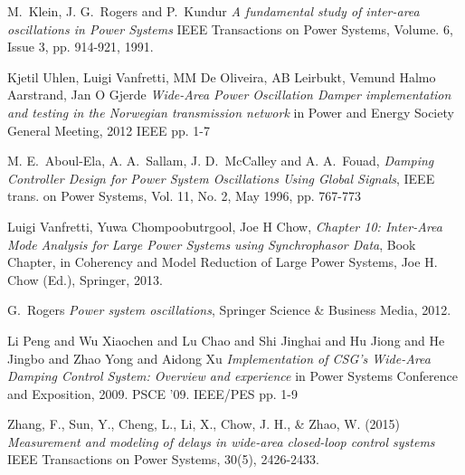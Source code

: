 \documentclass[journal]{IEEEtran}
\begin{document}
%
%
%
\begin{thebibliography}{1}

M.~Klein, J. G.~Rogers and P.~Kundur \emph{A fundamental study of inter-area oscillations in Power Systems}  IEEE Transactions on Power Systems, Volume. 6, Issue 3, pp. 914-921, 1991. 

 Kjetil Uhlen, Luigi Vanfretti, MM De Oliveira, AB Leirbukt, Vemund Halmo Aarstrand, Jan O Gjerde \emph{Wide-Area Power Oscillation Damper implementation and testing in the Norwegian transmission network} in Power and Energy Society General Meeting, 2012 IEEE pp. 1-7

  M. E.~Aboul-Ela, A. A.~Sallam, J. D.~McCalley and A. A.~Fouad, \emph{Damping Controller Design for Power System Oscillations Using Global Signals}, IEEE trans. on Power Systems, Vol. 11, No. 2, May 1996, pp. 767-773

  Luigi Vanfretti, Yuwa Chompoobutrgool, Joe H Chow, \emph{Chapter 10: Inter-Area Mode Analysis for Large Power Systems using Synchrophasor Data}, Book Chapter, in Coherency and Model Reduction of Large Power Systems, Joe H. Chow (Ed.), Springer, 2013.

 G.~Rogers \emph{Power system oscillations}, Springer Science \& Business Media, 2012. 

 Li Peng and Wu Xiaochen and Lu Chao and Shi Jinghai and Hu Jiong and He Jingbo and Zhao Yong and Aidong Xu \emph{Implementation of CSG's Wide-Area Damping Control System: Overview and experience} in Power Systems Conference and Exposition, 2009. PSCE '09. IEEE/PES pp. 1-9

 Zhang, F., Sun, Y., Cheng, L., Li, X., Chow, J. H., \& Zhao, W. (2015) \emph{Measurement and modeling of delays in wide-area closed-loop control systems} IEEE Transactions on Power Systems, 30(5), 2426-2433.


\end{thebibliography}
\end{document}
